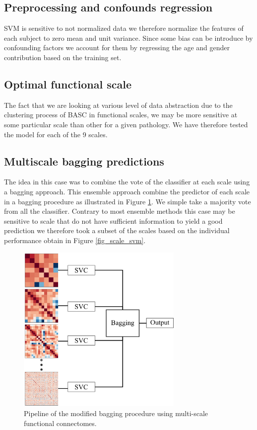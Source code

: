 \documentclass[12pt,journal,compsoc]{IEEEtran}
\begin{document}
\subsection{Preprocessing and confounds regression}

SVM is sensitive to not normalized data we therefore normalize the features of each subject to zero mean and unit variance. Since some bias can be introduce by confounding factors we account for them by regressing the age and gender contribution based on the training set.


\subsection{Optimal functional scale}
The fact that we are looking at various level of data abstraction due to the clustering process of BASC in functional scales, we may be more sensitive at some particular scale than other for a given pathology. We have therefore tested the model for each of the 9 scales.

\subsection{Multiscale bagging predictions}
The idea in this case was to combine the vote of the classifier at each scale using a bagging approach. This ensemble approach combine the predictor of each scale in a bagging procedure as illustrated in Figure \ref{fig_bagging_multiscale}. We simple take a majority vote from all the classifier. Contrary to most ensemble methods this case may be sensitive to scale that do not have sufficient information to yield a good prediction we therefore took a subset of the scales based on the individual performance obtain in Figure \ref{fig_scale_svm}.

\begin{figure}[h]
\centering
\includegraphics[width=8cm]{bagging_multiscale.png}
\caption{Pipeline of the modified bagging procedure using multi-scale functional connectomes.}
\label{fig_bagging_multiscale}
\end{figure}
\end{document}
